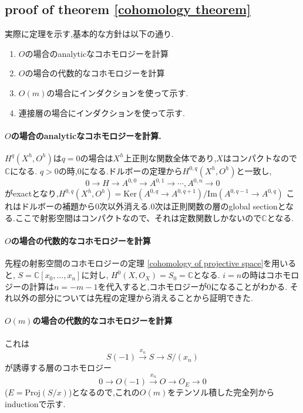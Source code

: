 \subsection{proof of theorem \ref{cohomology theorem}}
実際に定理を示す,基本的な方針は以下の通り.

\begin{enumerate}
  \item $O$の場合のanalyticなコホモロジーを計算
  \item $O$の場合の代数的なコホモロジーを計算
  \item $O(m)$の場合にインダクションを使って示す.
  \item 連接層の場合にインダクションを使って示す.
\end{enumerate}

\paragraph{$O$の場合のanalyticなコホモロジーを計算.}
$H^q(X^h, O^h)$は$q=0$の場合は$X^h$上正則な関数全体であり,$X$はコンパクトなので$\mathbb{C}$になる.
$q>0$の時,0になる.ドルボーの定理から$H^{0,q}(X^h, O^h)$と一致し,
\begin{equation*}
    0 \to H \to A^{0, 0} \to A^{0, 1} \to \cdots, A^{0, n} \to 0
\end{equation*}
がexactとなり,$H^{0,q}(X^h, O^h) = \mathrm{Ker}(A^{0,q} \to A^{0, q+1})/ \mathrm{Im}(A^{0, q-1} \to A^{0, q})$
これはドルボーの補題から$0$次以外消える.$0$次は正則関数の層のglobal sectionとなる.ここで射影空間はコンパクトなので、それは定数関数しかないので$\mathbb{C}$となる.

\paragraph{$O$の場合の代数的なコホモロジーを計算}
先程の射影空間のコホモロジーの定理 \ref{cohomology of projective space}を用いると,
$S = \mathbb{C}[x_0, \ldots, x_n]$に対し,
$H^0(X, O_X) = S_0 = \mathbb{C}$となる.
$i = n$の時はコホモロジーの計算は$n = -m-1$を代入すると,コホモロジーが0になることがわかる.
それ以外の部分については先程の定理から消えることから証明できた.


\paragraph{$O(m)$の場合の代数的なコホモロジーを計算}
これは
\begin{equation*}
    S(-1) \xrightarrow{x_n} S \to S/(x_n)
\end{equation*}
が誘導する層のコホモロジー
\begin{equation*}
  0 \to   O(-1) \xrightarrow{x_n} O \to O_E \to 0
\end{equation*}
($E = \mathrm{Proj}(S/x)$)となるので,これの$O(m)$をテンソル積した完全列からinductionで示す.

